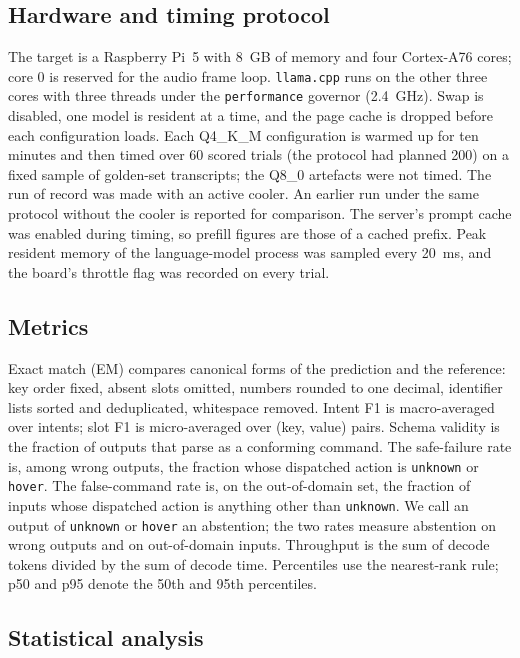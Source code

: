 \documentclass[a4paper,fleqn]{cas-dc}
\newcommand{\QF}{Q4\_K\_M}
\newcommand{\QE}{Q8\_0}
\begin{document}
\subsection{Hardware and timing protocol}
\label{sec:timing}

The target is a Raspberry Pi~5 with 8~GB of memory and four Cortex-A76 cores; core 0 is
reserved for the audio frame loop. \texttt{llama.cpp} runs on the other three cores with three
threads under the \texttt{performance} governor (2.4~GHz). Swap is disabled, one model is resident
at a time, and the page cache is dropped before each configuration loads. Each \QF{} configuration
is warmed up for ten minutes and then timed over 60 scored trials (the protocol had planned 200) on a fixed sample of golden-set
transcripts; the
\QE{} artefacts were not timed. The run of record was made with an active cooler. An earlier run
under the same protocol without the cooler is reported for comparison. The server's prompt cache
was enabled during timing, so prefill figures are those of a cached prefix. Peak resident memory
of the language-model process was sampled every 20~ms, and the board's throttle flag was recorded
on every trial.

\subsection{Metrics}
\label{sec:metrics}

Exact match (EM) compares canonical forms of the prediction and the reference: key order fixed,
absent slots omitted, numbers rounded to one decimal, identifier lists sorted and deduplicated,
whitespace removed. Intent F1 is macro-averaged over intents; slot F1 is micro-averaged over
(key, value) pairs. Schema validity is the fraction of outputs that parse as a conforming command.
The safe-failure rate is, among wrong outputs, the fraction whose dispatched action is
\texttt{unknown} or \texttt{hover}. The false-command rate is, on the out-of-domain set, the
fraction of inputs whose dispatched action is anything other than \texttt{unknown}. We call an output of \texttt{unknown} or \texttt{hover} an abstention; the two rates measure abstention on wrong outputs and on out-of-domain inputs. Throughput is the sum of decode tokens divided by the sum of decode time. Percentiles use the nearest-rank rule; p50 and p95
denote the 50th and 95th percentiles.

\subsection{Statistical analysis}
\label{sec:stats}
\end{document}
